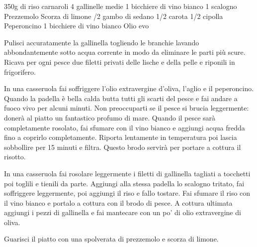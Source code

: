 \begin{ingreds}
	350g di riso carnaroli
	4 gallinelle medie
	1 bicchiere di vino bianco
	1 scalogno
	Prezzemolo
	Scorza di limone
\columnbreak
{}/2 gambo di sedano
	1/2 carota
	1/2 cipolla
	Peperoncino
	1 bicchiere di vino bianco
	Olio evo 

\end{ingreds}

\begin{method}
	Pulisci accuratamente la gallinella togliendo le branchie lavando abbondantemente sotto acqua corrente in modo da eliminare le parti più scure. Ricava per ogni pesce due filetti privati delle lische e della pelle e riponili in frigorifero.

	In una casseruola fai soffriggere l'olio extravergine d’oliva, l'aglio e il peperoncino. Quando la padella è bella calda butta tutti gli scarti del pesce e fai andare a fuoco vivo per alcuni minuti. Non preoccuparti se il pesce si brucia leggermente: donerà al piatto un fantastico profumo di mare. Quando il pesce sarà completamente rosolato, fai sfumare con il vino bianco e aggiungi acqua fredda fino a coprirlo completamente. Riporta lentamente in temperatura poi lascia sobbollire per 15 minuti e filtra. Questo brodo servirà per portare a cottura il risotto.

	In una casseruola fai rosolare leggermente i filetti di gallinella tagliati a tocchetti poi toglili e tienili da parte. Aggiungi alla stessa padella lo scalogno tritato, fai soffriggere leggermente, poi aggiungi il riso e fallo tostare. Fai sfumare il riso con il vino bianco e portalo a cottura con il brodo di pesce. A cottura ultimata aggiungi i pezzi di gallinella e fai mantecare con un po’ di olio extravergine di oliva.

	Guarisci il piatto con una spolverata di prezzemolo e scorza di limone.

\end {method}

